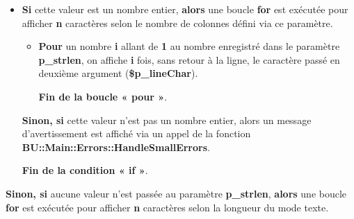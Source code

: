 \documentclass[a4paper,10pt]{article}
\begin{document}
\begin{itemize}
    \item
    {
        \begin{justify}
            \textbf{\color{cond}Si} cette valeur est un nombre entier, \textbf{\color{cond}alors} une boucle \textbf{\color{loop}for} est exécutée pour afficher \textbf{n} caractères selon le nombre de colonnes défini via ce paramètre.\setlength{\parskip}{2em}
        \end{justify}

        \setlength{\parskip}{1em}

        \begin{itemize}
            \item
            {
                \begin{justify}
                    \textbf{\color{loop}Pour} un nombre \textbf{\color{vars}i} allant de \textbf{\color{loop}1} au nombre enregistré dans le paramètre \textbf{\color{vars}p\_strlen}, on affiche \textbf{\color{vars}i} fois, sans retour à la ligne, le caractère passé en deuxième argument (\textbf{\color{vars}\$p\_lineChar}).
                \end{justify}\setlength{\parskip}{1em}

                \begin{justify}
                    \textbf{\color{loop}Fin de la boucle « pour »}.
                \end{justify}
            }
        \end{itemize}

        \begin{justify}
            \textbf{\color{cond}Sinon, si} cette valeur n'est pas un nombre entier, alors un message d'avertissement est affiché via un appel de la fonction \textbf{\color{func}BU::Main::Errors::HandleSmallErrors}.
        \end{justify}

        \setlength{\parskip}{1em}

        \begin{justify}
            \textbf{\color{cond}Fin de la condition « if »}.
        \end{justify}
        
        \setlength{\parskip}{1em}
    }
\end{itemize}


\begin{justify}
    \textbf{\color{cond}Sinon, si} aucune valeur n'est passée au paramètre \textbf{\color{vars}p\_strlen}, \textbf{\color{cond}alors} une boucle \textbf{\color{loop}for} est exécutée pour afficher \textbf{n} caractères selon la longueur du mode texte.
\end{justify}\setlength{\parskip}{1em}
\end{document}
